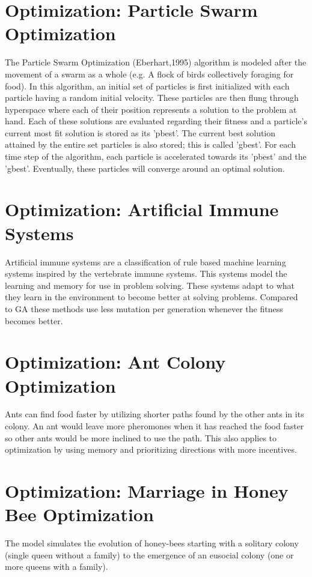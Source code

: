 \section{Optimization: Particle Swarm Optimization}
The Particle Swarm Optimization (Eberhart,1995) algorithm is modeled after the movement of a swarm as a whole (e.g. A flock
of birds collectively foraging for food). In this algorithm, an initial set of particles is first initialized with each
particle having a random initial velocity. These particles are then flung through hyperspace where each of their position
represents a solution to the problem at hand. Each of these solutions are evaluated regarding their fitness and a particle's
current most fit solution is stored as its 'pbest'. The current best solution attained by the entire set particles is also stored; this is called 'gbest'. For each time step of the algorithm, each particle is accelerated towards its 'pbest' and the 'gbest'. Eventually, these particles will converge around an optimal solution.

\section{Optimization: Artificial Immune Systems}
Artificial immune systems are a classification of rule based machine learning systems inspired by the vertebrate immune systems. This systems model the learning and memory for use in problem solving. These systems adapt to what they learn in the environment to become better at solving problems. Compared to GA these methods use less mutation per generation whenever the fitness becomes better.

\section{Optimization: Ant Colony Optimization}
Ants can find food faster by utilizing shorter paths found by the other ants in its colony. An ant would leave more pheromones when it has reached the food faster so other ants would be more inclined to use the path. This also applies to optimization by using memory and prioritizing directions with more incentives.

\section{Optimization: Marriage in Honey Bee Optimization}
The model simulates the evolution of honey-bees starting with a solitary colony (single queen without a family) to the emergence of an eusocial colony (one or more queens with a family).

